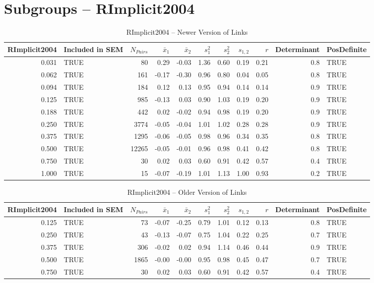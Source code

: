 \documentclass{article}\usepackage[]{graphicx}\usepackage[]{color}
\begin{document}
\section{Subgroups --  RImplicit2004 }%
\begin{table}[ht]
\centering
\begin{tabular}{rlrrrrrrrrl}
  \hline
RImplicit2004 & Included in SEM & $N_{Pairs}$ & $\bar{x}_1$ & $\bar{x}_2$ & $s_1^2$ & $s_2^2$ & $s_{1,2}$ & $r$ & Determinant & PosDefinite \\ 
  \hline
0.031 & TRUE & 80 & 0.29 & -0.03 & 1.36 & 0.60 & 0.19 & 0.21 & 0.8 & TRUE \\ 
  0.062 & TRUE & 161 & -0.17 & -0.30 & 0.96 & 0.80 & 0.04 & 0.05 & 0.8 & TRUE \\ 
  0.094 & TRUE & 184 & 0.12 & 0.13 & 0.95 & 0.94 & 0.14 & 0.14 & 0.9 & TRUE \\ 
  0.125 & TRUE & 985 & -0.13 & 0.03 & 0.90 & 1.03 & 0.19 & 0.20 & 0.9 & TRUE \\ 
  0.188 & TRUE & 442 & 0.02 & -0.02 & 0.94 & 0.98 & 0.19 & 0.20 & 0.9 & TRUE \\ 
  0.250 & TRUE & 3774 & -0.05 & -0.04 & 1.01 & 1.02 & 0.28 & 0.28 & 0.9 & TRUE \\ 
  0.375 & TRUE & 1295 & -0.06 & -0.05 & 0.98 & 0.96 & 0.34 & 0.35 & 0.8 & TRUE \\ 
  0.500 & TRUE & 12265 & -0.05 & -0.01 & 0.96 & 0.98 & 0.41 & 0.42 & 0.8 & TRUE \\ 
  0.750 & TRUE & 30 & 0.02 & 0.03 & 0.60 & 0.91 & 0.42 & 0.57 & 0.4 & TRUE \\ 
  1.000 & TRUE & 15 & -0.07 & -0.19 & 1.01 & 1.13 & 1.00 & 0.93 & 0.2 & TRUE \\ 
   \hline
\end{tabular}
\caption{RImplicit2004 -- Newer Version of Links} 
\end{table}
\begin{table}[ht]
\centering
\begin{tabular}{rlrrrrrrrrl}
  \hline
RImplicit2004 & Included in SEM & $N_{Pairs}$ & $\bar{x}_1$ & $\bar{x}_2$ & $s_1^2$ & $s_2^2$ & $s_{1,2}$ & $r$ & Determinant & PosDefinite \\ 
  \hline
0.125 & TRUE & 73 & -0.07 & -0.25 & 0.79 & 1.01 & 0.12 & 0.13 & 0.8 & TRUE \\ 
  0.250 & TRUE & 43 & -0.13 & -0.07 & 0.75 & 1.04 & 0.22 & 0.25 & 0.7 & TRUE \\ 
  0.375 & TRUE & 306 & -0.02 & 0.02 & 0.94 & 1.14 & 0.46 & 0.44 & 0.9 & TRUE \\ 
  0.500 & TRUE & 1865 & -0.00 & -0.00 & 0.95 & 0.98 & 0.45 & 0.47 & 0.7 & TRUE \\ 
  0.750 & TRUE & 30 & 0.02 & 0.03 & 0.60 & 0.91 & 0.42 & 0.57 & 0.4 & TRUE \\ 
   \hline
\end{tabular}
\caption{RImplicit2004 -- Older Version of Links} 
\end{table}
\end{document}
